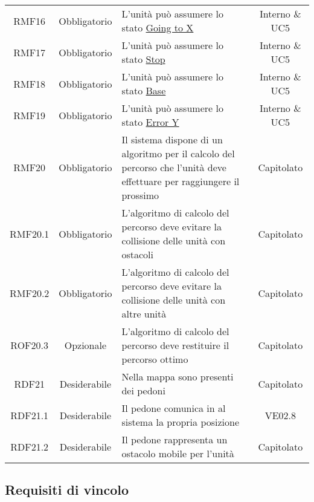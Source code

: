 \begin{longtable}[h!] { c c m{8cm} c}
		RMF16 & Obbligatorio & L'unità può assumere lo stato \underline{Going to X} & Interno \& UC5 \\
		
		RMF17 & Obbligatorio & L'unità può assumere lo stato \underline{Stop} & Interno \& UC5 \\
		
		RMF18 & Obbligatorio & L'unità può assumere lo stato \underline{Base} & Interno \& UC5 \\
		
		RMF19 & Obbligatorio & L'unità può assumere lo stato \underline{Error Y} & Interno \& UC5 \\
		
		RMF20 & Obbligatorio & Il sistema dispone di un algoritmo per il calcolo del percorso che l'unità deve effettuare per raggiungere il prossimo \glock{POI} & Capitolato \\
		
		RMF20.1 & Obbligatorio & L'algoritmo di calcolo del percorso deve evitare la collisione delle unità con ostacoli & Capitolato \\
		
		RMF20.2 & Obbligatorio & L'algoritmo di calcolo del percorso deve evitare la collisione delle unità con altre unità & Capitolato \\
		
		ROF20.3 & Opzionale & L'algoritmo di calcolo del percorso deve restituire il percorso ottimo & Capitolato \\
		
		RDF21 & Desiderabile & Nella mappa sono presenti dei pedoni & Capitolato \\
		
		RDF21.1 & Desiderabile & Il pedone comunica in \glock{real-time} al sistema la propria posizione & VE02.8 \\
		
		RDF21.2 & Desiderabile & Il pedone rappresenta un ostacolo mobile per l'unità & Capitolato \\

	\end{longtable}

\newpage

\subsection{Requisiti di vincolo}

